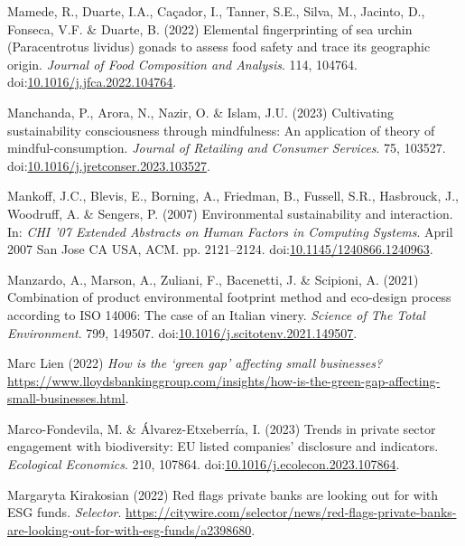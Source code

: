 \documentclass[
  letterpaper,
  DIV=11,
  numbers=noendperiod]{scrartcl}
\newlength{\cslhangindent}
\newenvironment{CSLReferences}[2] %
 {\begin{list}{}{%
  \setlength{\itemindent}{0pt}
  \setlength{\leftmargin}{0pt}
  \setlength{\parsep}{0pt}
  \ifodd #1
   \setlength{\leftmargin}{\cslhangindent}
   \setlength{\itemindent}{-1\cslhangindent}
  \fi
  \setlength{\itemsep}{#2\baselineskip}}}
 {\end{list}}
\begin{document}
\begin{CSLReferences}{0}{1}
Mamede, R., Duarte, I.A., Caçador, I., Tanner, S.E., Silva, M., Jacinto,
D., Fonseca, V.F. \& Duarte, B. (2022) Elemental fingerprinting of sea
urchin ({Paracentrotus} lividus) gonads to assess food safety and trace
its geographic origin. \emph{Journal of Food Composition and Analysis}.
114, 104764.
doi:\href{https://doi.org/10.1016/j.jfca.2022.104764}{10.1016/j.jfca.2022.104764}.

Manchanda, P., Arora, N., Nazir, O. \& Islam, J.U. (2023) Cultivating
sustainability consciousness through mindfulness: {An} application of
theory of mindful-consumption. \emph{Journal of Retailing and Consumer
Services}. 75, 103527.
doi:\href{https://doi.org/10.1016/j.jretconser.2023.103527}{10.1016/j.jretconser.2023.103527}.

Mankoff, J.C., Blevis, E., Borning, A., Friedman, B., Fussell, S.R.,
Hasbrouck, J., Woodruff, A. \& Sengers, P. (2007) Environmental
sustainability and interaction. In: \emph{{CHI} '07 {Extended Abstracts}
on {Human Factors} in {Computing Systems}}. April 2007 San Jose CA USA,
ACM. pp. 2121--2124.
doi:\href{https://doi.org/10.1145/1240866.1240963}{10.1145/1240866.1240963}.

Manzardo, A., Marson, A., Zuliani, F., Bacenetti, J. \& Scipioni, A.
(2021) Combination of product environmental footprint method and
eco-design process according to {ISO} 14006: {The} case of an {Italian}
vinery. \emph{Science of The Total Environment}. 799, 149507.
doi:\href{https://doi.org/10.1016/j.scitotenv.2021.149507}{10.1016/j.scitotenv.2021.149507}.

Marc Lien (2022) \emph{How is the {`green gap'} affecting small
businesses?}
\url{https://www.lloydsbankinggroup.com/insights/how-is-the-green-gap-affecting-small-businesses.html}.

Marco-Fondevila, M. \& Álvarez-Etxeberría, I. (2023) Trends in private
sector engagement with biodiversity: {EU} listed companies' disclosure
and indicators. \emph{Ecological Economics}. 210, 107864.
doi:\href{https://doi.org/10.1016/j.ecolecon.2023.107864}{10.1016/j.ecolecon.2023.107864}.

Margaryta Kirakosian (2022) Red flags private banks are looking out for
with {ESG} funds. \emph{Selector}.
\url{https://citywire.com/selector/news/red-flags-private-banks-are-looking-out-for-with-esg-funds/a2398680}.


\end{CSLReferences}
\end{document}
